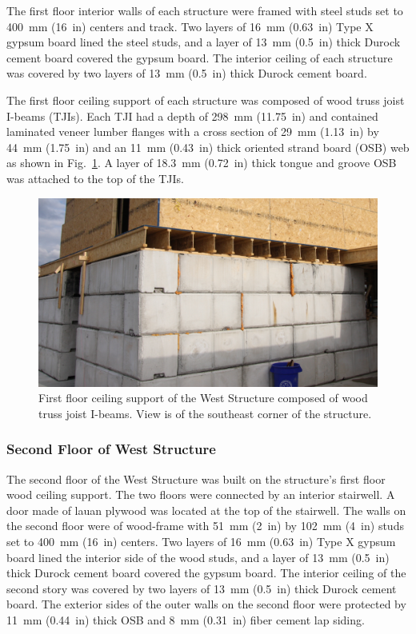 \documentclass[12pt,oneside]{book}
\begin{document}
The first floor interior walls of each structure were framed with steel studs set to 400~mm (16~in) centers and track. Two layers of 16~mm (0.63~in) Type X gypsum board lined the steel studs, and a layer of 13~mm (0.5~in) thick Durock cement board covered the gypsum board. The interior ceiling of each structure was covered by two layers of 13~mm (0.5~in) thick Durock cement board.
\FloatBarrier

The first floor ceiling support of each structure was composed of wood truss joist I-beams (TJIs). Each TJI had a depth of 298~mm (11.75~in) and contained laminated veneer lumber flanges with a cross section of 29~mm (1.13~in) by 44~mm (1.75~in) and an 11~mm (0.43~in) thick oriented strand board (OSB) web as shown in Fig.~\ref{fig:TJI}. A layer of 18.3~mm (0.72~in) thick tongue and groove OSB was attached to the top of the TJIs.

\begin{figure}[!ht]
	\includegraphics[width=6in]{../../Hose_Stream_Tests/Figures/Pictures/TJI_support}
	\caption[Ceiling support of the West Structure.]{First floor ceiling support of the West Structure composed of wood truss joist I-beams. View is of the southeast corner of the structure.}
	\label{fig:TJI}
\end{figure}
\FloatBarrier

\subsubsection{Second Floor of West Structure}
The second floor of the West Structure was built on the structure's first floor wood ceiling support. The two floors were connected by an interior stairwell. A door made of lauan plywood was located at the top of the stairwell. The walls on the second floor were of wood-frame with 51~mm (2~in) by 102~mm (4~in) studs set to 400~mm (16~in) centers. Two layers of 16~mm (0.63~in) Type X gypsum board lined the interior side of the wood studs, and a layer of 13~mm (0.5~in) thick Durock cement board covered the gypsum board. The interior ceiling of the second story was covered by two layers of 13~mm (0.5~in) thick Durock cement board. The exterior sides of the outer walls on the second floor were protected by 11~mm (0.44~in) thick OSB and 8~mm (0.31~in) fiber cement lap siding.
\end{document}
